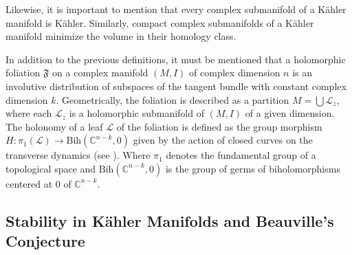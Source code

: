 \documentclass{article}
\newcommand{\co}{\ensuremath{\mathbb C }}
\begin{document}
Likewise, it is important to mention that every complex submanifold of a K\"ahler manifold is K\"ahler. Similarly, compact complex submanifolds of a K\"ahler manifold minimize the volume in their homology class.

In addition to the previous definitions, it must be mentioned that a holomorphic foliation $\mathfrak{F}$ on a complex manifold $(M,I)$ of complex dimension
$n$ is an involutive distribution of subspaces of the tangent bundle with constant complex dimension $k$. Geometrically, the foliation is described as a
partition $M=\bigcup\mathcal{L}_z$, where each $\mathcal{L}_z$ is a holomorphic submanifold of $(M,I)$ of a given dimension. The
holonomy of a leaf $\mathcal{L}$ of the foliation is defined as the group morphism $H:\pi_{1}(\mathcal{L})\rightarrow\textrm{Bih}(\co^{n-k},0)$ given by the
action of closed curves on the transverse dynamics (see \cite{Thurston}). Where $\pi_{1}$ denotes the fundamental group of a topological space and
    $\textrm{Bih}(\co^{n-k},0)$ is the group of germs of biholomorphisms centered at $0$ of $\co^{n-k}$.

\subsection{Stability in K\"ahler Manifolds and Beauville's Conjecture}
\end{document}
